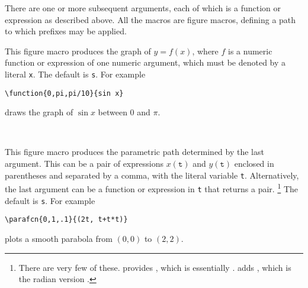 \documentclass[letterpaper]{article}
\begin{document}
There are one or more subsequent arguments, each of which is a \MF{}
function or expression as described above. All the macros are figure
macros, defining a path to which prefixes may be applied.

\begin{cd}
%
\end{cd}

This figure macro produces the graph of $y = f(x)$, where $f$ is a \MF{} numeric
function or expression of one numeric argument, which must be denoted by
a literal \texttt{x}. The default  is \texttt{s}. For example
\begin{verbatim}
\function{0,pi,pi/10}{sin x}
\end{verbatim}
draws the graph of $\sin x$ between 0 and $\pi$.

\begin{cd}
%
    \\
%
\end{cd}

This figure macro produces the parametric path determined by the last
argument. This can be a pair of expressions $x(\mathtt{t})$ and
$y(\mathtt{t})$ enclosed in parentheses and separated by a comma, with
the literal variable \texttt{t}. Alternatively, the last argument can be
a \MF{} function or expression in \texttt{t} that returns a pair.%
    \footnote{There are very few of these. \CMF{} provides ,
    which is essentially . \Mfp{} adds , which is the radian version .}
The default  is \texttt{s}. For example
\begin{verbatim}
\parafcn{0,1,.1}{(2t, t+t*t)}
\end{verbatim}
plots a smooth parabola from $(0,0)$ to $(2,2)$.

\begin{cd}
%
\end{cd}
\end{document}
